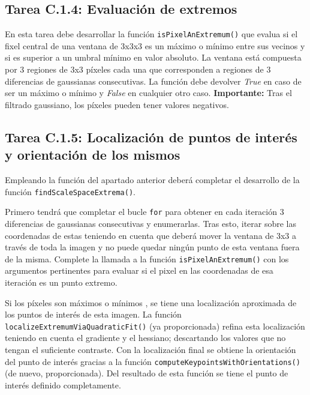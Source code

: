 \subsection*{Tarea C.1.4: Evaluación de extremos}

En esta tarea debe desarrollar la función \texttt{isPixelAnExtremum()} que evalua si el fixel central de una ventana de 3x3x3 es un máximo o mínimo entre sus vecinos y si es superior a un umbral mínimo en valor absoluto. La ventana está compuesta por 3 regiones de 3x3 píxeles cada una que corresponden a regiones de 3 diferencias de gaussianas consecutivas. La función debe devolver \textit{True} en caso de ser un máximo o mínimo y \textit{False} en cualquier otro caso. \textbf{Importante:} Tras el filtrado gaussiano, los píxeles pueden tener valores negativos.

\subsection*{Tarea C.1.5: Localización de puntos de interés y orientación de los mismos}

Empleando la función del apartado anterior deberá completar el desarrollo de la función \texttt{findScaleSpaceExtrema()}.

Primero tendrá que completar el bucle \texttt{for} para obtener en cada iteración 3 diferencias de gaussianas consecutivas y enumerarlas. Tras esto, iterar sobre las coordenadas de estas teniendo en cuenta que deberá mover la ventana de 3x3 a través de toda la imagen y no puede quedar ningún punto de esta ventana fuera de la misma. Complete la llamada a la función \texttt{isPixelAnExtremum()} con los argumentos pertinentes para evaluar si el pixel en las coordenadas de esa iteración es un punto extremo.

Si los píxeles son máximos o mínimos , se tiene una localización aproximada de los puntos de interés de esta imagen. La función \texttt{localizeExtremumViaQuadraticFit()} (ya proporcionada) refina esta localización teniendo en cuenta el gradiente y el hessiano; descartando los valores que no tengan el suficiente contraste. Con la localización final se obtiene la orientación del punto de interés gracias a la función \texttt{computeKeypointsWithOrientations()} (de nuevo, proporcionada). Del resultado de esta función se tiene el punto de interés definido completamente.

